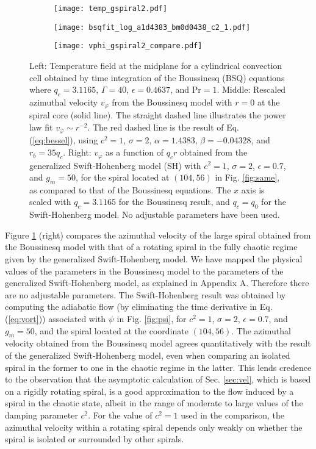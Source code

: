 \documentclass[preprint,prx,floatfix]{revtex4-1}
\begin{document}
\begin{figure}[htp]
    \centering
	\begin{subfigure}[b]{0.37\textwidth}
	\texttt{[image: temp\_gspiral2.pdf]}
	\end{subfigure}
	\begin{subfigure}[b]{0.3\textwidth}
    \texttt{[image: bsqfit\_log\_a1d4383\_bm0d0438\_c2\_1.pdf]}
    \end{subfigure}
    \begin{subfigure}[b]{0.3\textwidth}
    \texttt{[image: vphi\_gspiral2\_compare.pdf]}
    \end{subfigure}
    \caption{Left: Temperature field at the midplane for a cylindrical convection cell obtained by time integration of the Boussinesq (BSQ) equations where $q_c = 3.1165$, $\Gamma=40$, $\epsilon=0.4637$, and $\text{Pr}=1$.  Middle: Rescaled azimuthal velocity $v_\varphi$ from the Boussinesq model with $r=0$ at the spiral core (solid line). The straight dashed line illustrates the power law fit $v_{\varphi} \sim r^{-2}$. The red dashed line is the result of Eq. (\ref{eq:bessel}), using $c^2=1$, $\sigma = 2$, $\alpha = 1.4383$, $\beta = -0.04328$, and $r_b = 35 q_c$. Right: $v_{\varphi}$ as a function of $q_{c}r$ obtained from the generalized Swift-Hohenberg model (SH) with $c^2 = 1$, $\sigma = 2$, $\epsilon = 0.7$, and $g_m = 50$, for the spiral located at $(104,56)$ in Fig. \ref{fig:same}, as compared to that of the Boussinesq equations. The $x$ axis is scaled with $q_{c} = 3.1165$ for the Boussinesq result, and $q_{c} = q_{0}$ for the Swift-Hohenberg model. No adjustable parameters have been used.}
	\label{fig:gspiral}
\end{figure}

Figure \ref{fig:gspiral} (right) compares the azimuthal velocity of the large spiral obtained from the Boussinesq model with that of a rotating spiral in the fully chaotic regime given by the generalized Swift-Hohenberg model. We have mapped the physical values of the parameters in the Boussinesq model to the parameters of the generalized Swift-Hohenberg model, as explained in Appendix A. Therefore there are no adjustable parameters. The Swift-Hohenberg result was obtained by computing the adiabatic flow (by eliminating the time derivative in Eq. (\ref{eq:vort})) associated with $\psi$ in Fig. \ref{fig:psi}, for $c^2 = 1$, $\sigma = 2$, $\epsilon = 0.7$, and $g_m = 50$, and the spiral located at the coordinate $(104,56)$. The azimuthal velocity obtained from the Boussinesq model agrees quantitatively with the result of the generalized Swift-Hohenberg model, even when comparing an isolated spiral in the former to one in the chaotic regime in the latter. This lends credence to the observation that the asymptotic calculation of Sec. \ref{sec:vel}, which is based on a rigidly rotating spiral, is a good approximation to the flow induced by a spiral in the chaotic state, albeit in the range of moderate to large values of the damping parameter $c^{2}$. For the value of $c^{2} = 1$ used in the comparison, the azimuthal velocity within a rotating spiral depends only weakly on whether the spiral is isolated or surrounded by other spirals. 
\end{document}
